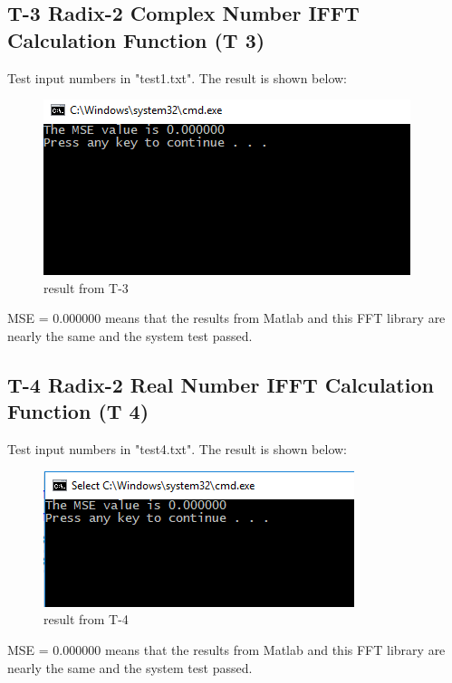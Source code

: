 \documentclass[12pt, titlepage]{article}
\begin{document}
\subsection {T-3 Radix-2 Complex Number IFFT Calculation Function (T 3)}
Test input numbers in "test1.txt".  The result is shown below:\\
\begin{figure}[H]
 \includegraphics[width=\linewidth]{t3.PNG}
  \caption{result from T-3}
  \label{fig:T3}
\end{figure}
MSE = 0.000000 means that the results from Matlab and this FFT library are nearly the same and the system test passed.

\subsection {T-4 Radix-2 Real Number IFFT Calculation Function  (T 4)}
Test input numbers in "test4.txt".  The result is shown below:\\
\begin{figure}[H]
 \includegraphics[width=\linewidth]{t4.PNG}
  \caption{result from T-4}
  \label{fig:T4}
\end{figure}
MSE = 0.000000 means that the results from Matlab and this FFT library are nearly the same and the system test passed.
\end{document}
